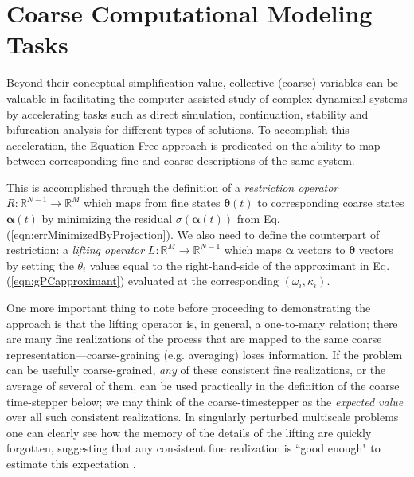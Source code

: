 \documentclass[numbers]{frontiersSCNS}
\renewcommand{\vec}[1]{\bm{#1}}
\newcommand{\degree}{\kappa}
\newcommand{\numNodes}{{N}}
\newcommand{\numCofs}{{M}}
\newcommand{\eqnRef}[1]{Eq. (\ref{eqn:#1})}
\newcommand{\wordDefn}[1]{\emph{#1}}
\begin{document}
\section{Coarse Computational Modeling Tasks}
\label{sec:coarseTasks}

Beyond their conceptual simplification value, collective (coarse) variables
can be valuable in facilitating the computer-assisted study of
complex dynamical systems by accelerating tasks such as direct simulation,
continuation, stability and bifurcation analysis for different types of
solutions.
%
To accomplish this acceleration, the Equation-Free approach \cite{Kevrekidis2003,Kevrekidis2004}
is predicated on the ability to map between corresponding fine and coarse
descriptions of the same system.

This is accomplished through the definition of a \wordDefn{restriction operator}
$R : \mathbb R^{\numNodes-1} \rightarrow \mathbb R^\numCofs$
which maps from fine states $\vec \theta(t)$
to corresponding coarse states $\vec\alpha(t)$
by minimizing the residual $\sigma(\vec \alpha(t))$ from \eqnRef{errMinimizedByProjection}.
%
We also need to define the counterpart of restriction: a \wordDefn{lifting operator}
$L : \mathbb R^\numCofs \rightarrow \mathbb R^{\numNodes-1}$
which maps $\vec\alpha$ vectors to $\vec\theta$ vectors
by setting the $\theta_i$ values equal to the right-hand-side of
the approximant in \eqnRef{gPCapproximant}
evaluated at the corresponding $(\omega_i, \degree_i)$.


One more important thing to note before proceeding to demonstrating the approach is that
the lifting operator is, in general, a one-to-many relation; there are many
fine realizations of the process that are mapped to the same
coarse representation---coarse-graining (e.g. averaging) loses information.
%
If the problem can be usefully coarse-grained, \emph{any} of these consistent fine
realizations, or the average of several of them, can be used practically in the definition
of the coarse time-stepper below; we may think of the coarse-timestepper as the
{\em expected value} over all such consistent realizations.
%
In singularly perturbed multiscale problems one can clearly see how the memory
of the details of the lifting are quickly forgotten, suggesting that any
consistent fine realization is ``good enough" to estimate this expectation \cite{Gear2002,Kevrekidis2009}.
\end{document}
